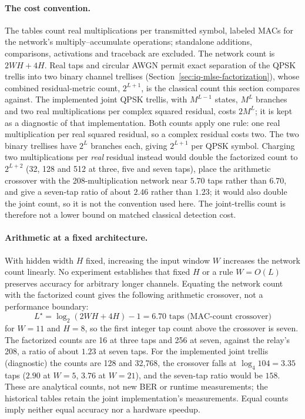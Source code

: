 \paragraph{The cost convention.} The tables count real multiplications per transmitted symbol, labeled MACs for the network's multiply--accumulate operations; standalone additions, comparisons, activations and traceback are excluded. The network count is $2WH+4H$. Real taps and circular AWGN permit exact separation of the QPSK trellis into two binary channel trellises (Section~\ref{sec:iq-mlse-factorization}), whose combined residual-metric count, $2^{L+1}$, is the classical count this section compares against. The implemented joint QPSK trellis, with $M^{L-1}$ states, $M^L$ branches and two real multiplications per complex squared residual, costs $2M^L$; it is kept as a diagnostic of that implementation. Both counts apply one rule: one real multiplication per real squared residual, so a complex residual costs two. The two binary trellises have $2^{L}$ branches each, giving $2^{L+1}$ per QPSK symbol. Charging two multiplications per \emph{real} residual instead would double the factorized count to $2^{L+2}$ (32, 128 and 512 at three, five and seven taps), place the arithmetic crossover with the 208-multiplication network near $5.70$ taps rather than $6.70$, and give a seven-tap ratio of about $2.46$ rather than $1.23$; it would also double the joint count, so it is not the convention used here. The joint-trellis count is therefore not a lower bound on matched classical detection cost.

\paragraph{Arithmetic at a fixed architecture.} With hidden width $H$ fixed, increasing the input window $W$ increases the network count linearly. No experiment establishes that fixed $H$ or a rule $W=O(L)$ preserves accuracy for arbitrary longer channels. Equating the network count with the factorized count gives the following arithmetic crossover, not a performance boundary:
\begin{equation}
L^{\star} = \log_{2}\!\left(2WH + 4H\right) - 1 = 6.70 \text{ taps (MAC-count crossover)}
\label{eq:mac-crossover}
\end{equation}
for $W=11$ and $H=8$, so the first integer tap count above the crossover is seven. The factorized counts are 16 at three taps and 256 at seven, against the relay's 208, a ratio of about $1.23$ at seven taps. For the implemented joint trellis (diagnostic) the counts are 128 and 32{,}768, the crossover falls at $\log_4 104 = 3.35$ taps ($2.90$ at $W=5$, $3.76$ at $W=21$), and the seven-tap ratio would be $158$. These are analytical counts, not new BER or runtime measurements; the historical tables retain the joint implementation's measurements. Equal counts imply neither equal accuracy nor a hardware speedup.

